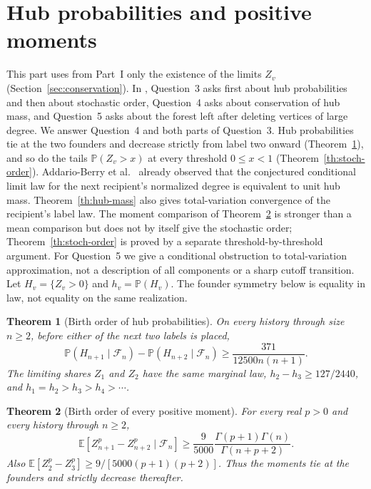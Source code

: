 \documentclass[11pt]{article}
\newtheorem{theorem}{Theorem}
\newcommand{\resulttag}{?}
\newcommand{\tagnext}[1]{\renewcommand{\resulttag}{#1}}
\newcommand{\sectag}[1]{\renewcommand{\thesection}{#1}\renewcommand{\theHsection}{#1}}
\theoremstyle{remark}
\numberwithin{equation}{section}
\newcommand{\E}{\mathbb E}
\newcommand{\Prob}{\mathbb P}
\begin{document}
\sectag{BIRTH}
\section{Hub probabilities and positive moments}\label{sec:hubs}\label{sec:hub-proofs}
This part uses from Part~I only the existence of the limits $Z_v$ (Section~\ref{sec:conservation}).
In \cite[Sec.~7]{AB}, Question~3 asks first about hub probabilities and then about stochastic order, Question~4 asks about conservation of hub mass, and Question~5 asks about the forest left after deleting vertices of large degree. We answer Question~4 and both parts of Question~3. Hub probabilities tie at the two founders and decrease strictly from label two onward (Theorem~\ref{th:hub-order}), and so do the tails $\Prob(Z_v>x)$ at every threshold $0\le x<1$ (Theorem~\ref{th:stoch-order}). Addario-Berry et al.\ \cite[Sec.~3]{AB} already observed that the conjectured conditional limit law for the next recipient's normalized degree is equivalent to unit hub mass. Theorem~\ref{th:hub-mass} also gives total-variation convergence of the recipient's label law. The moment comparison of Theorem~\ref{th:hub-moment-order} is stronger than a mean comparison but does not by itself give the stochastic order; Theorem~\ref{th:stoch-order} is proved by a separate threshold-by-threshold argument. For Question~5 we give a conditional obstruction to total-variation approximation, not a description of all components or a sharp cutoff transition.
Let $H_v=\{Z_v>0\}$ and $h_v=\Prob(H_v)$. The founder symmetry below is equality in law, not equality on the same realization.

\tagnext{HUB}
\begin{theorem}[Birth order of hub probabilities]\label{th:hub-order}
On every history through size $n\ge2$, before either of the next two labels is placed,
\[
 \Prob(H_{n+1}\mid\mathcal F_n)-\Prob(H_{n+2}\mid\mathcal F_n)
 \ge \frac{371}{12500 n(n+1)}.
\]
The limiting shares $Z_1$ and $Z_2$ have the same marginal law, $h_2-h_3\ge127/2440$, and $h_1=h_2>h_3>h_4>\cdots$.
\end{theorem}

\tagnext{MOM}
\begin{theorem}[Birth order of every positive moment]\label{th:hub-moment-order}
For every real $p>0$ and every history through $n\ge2$,
\[
 \E[Z_{n+1}^p-Z_{n+2}^p\mid\mathcal F_n]
 \ge \frac9{5000}\frac{\Gamma(p+1)\Gamma(n)}{\Gamma(n+p+2)}.
\]
Also $\E[Z_2^p-Z_3^p]\ge 9/[5000(p+1)(p+2)]$. Thus the moments tie at the founders and strictly decrease thereafter.
\end{theorem}
\end{document}
